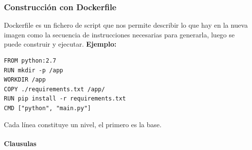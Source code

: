 \documentclass[12pt, twoside, openright]{report} %
\begin{document}
\subsubsection{Construcción con Dockerfile}
Dockerfile es un fichero de script que nos permite describir lo que hay en la nueva imagen como la secuencia de instrucciones necesarias para generarla, luego se puede construir y ejecutar. \textbf{Ejemplo:}
\begin{lstlisting}
FROM python:2.7
RUN mkdir -p /app
WORKDIR /app
COPY ./requirements.txt /app/
RUN pip install -r requirements.txt
CMD ["python", "main.py"]
\end{lstlisting}

Cada línea constituye un nivel, el primero es la base.

\paragraph{Clausulas}
\end{document}
